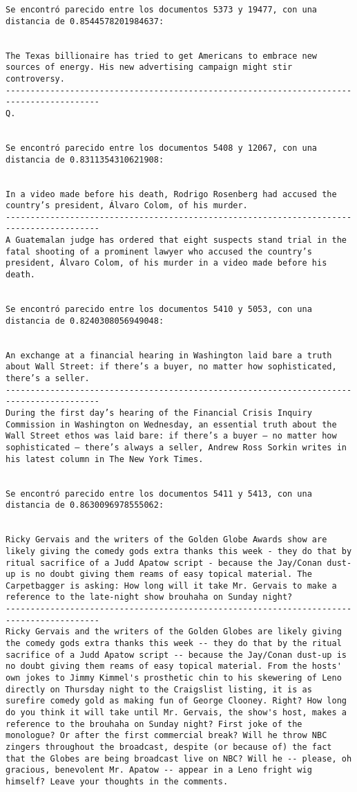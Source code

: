 \documentclass[11pt]{article}
\begin{document}
\begin{Verbatim}[commandchars=\\\{\}]
Se encontró parecido entre los documentos 5373 y 19477, con una distancia de 0.8544578201984637:


The Texas billionaire has tried to get Americans to embrace new sources of energy. His new advertising campaign might stir controversy.
-----------------------------------------------------------------------------------------
Q.


Se encontró parecido entre los documentos 5408 y 12067, con una distancia de 0.8311354310621908:


In a video made before his death, Rodrigo Rosenberg had accused the country’s president, Álvaro Colom, of his murder.
-----------------------------------------------------------------------------------------
A Guatemalan judge has ordered that eight suspects stand trial in the fatal shooting of a prominent lawyer who accused the country’s president, Álvaro Colom, of his murder in a video made before his death.


Se encontró parecido entre los documentos 5410 y 5053, con una distancia de 0.8240308056949048:


An exchange at a financial hearing in Washington laid bare a truth about Wall Street: if there’s a buyer, no matter how sophisticated, there’s a seller.
-----------------------------------------------------------------------------------------
During the first day’s hearing of the Financial Crisis Inquiry Commission in Washington on Wednesday, an essential truth about the Wall Street ethos was laid bare: if there’s a buyer — no matter how sophisticated — there’s always a seller, Andrew Ross Sorkin writes in his latest column in The New York Times.


Se encontró parecido entre los documentos 5411 y 5413, con una distancia de 0.8630096978555062:


Ricky Gervais and the writers of the Golden Globe Awards show are likely giving the comedy gods extra thanks this week - they do that by ritual sacrifice of a Judd Apatow script - because the Jay/Conan dust-up is no doubt giving them reams of easy topical material. The Carpetbagger is asking: How long will it take Mr. Gervais to make a reference to the late-night show brouhaha on Sunday night?
-----------------------------------------------------------------------------------------
Ricky Gervais and the writers of the Golden Globes are likely giving the comedy gods extra thanks this week -- they do that by the ritual sacrifice of a Judd Apatow script -- because the Jay/Conan dust-up is no doubt giving them reams of easy topical material. From the hosts' own jokes to Jimmy Kimmel's prosthetic chin to his skewering of Leno directly on Thursday night to the Craigslist listing, it is as surefire comedy gold as making fun of George Clooney. Right? How long do you think it will take until Mr. Gervais, the show's host, makes a reference to the brouhaha on Sunday night? First joke of the monologue? Or after the first commercial break? Will he throw NBC zingers throughout the broadcast, despite (or because of) the fact that the Globes are being broadcast live on NBC? Will he -- please, oh gracious, benevolent Mr. Apatow -- appear in a Leno fright wig himself? Leave your thoughts in the comments.



\end{Verbatim}
\end{document}
